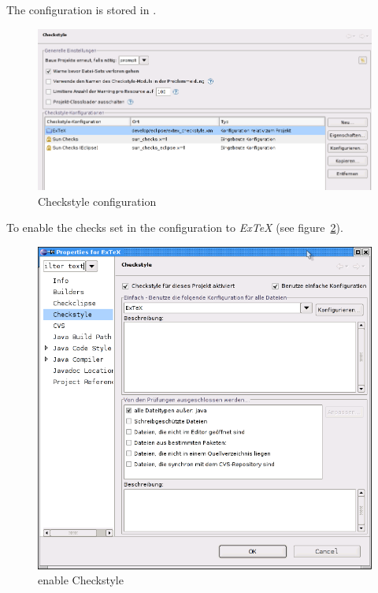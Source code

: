 The configuration is stored in .
\begin{figure}[htp]
  \centering  \includegraphics[scale=.5]{image/eclipse/checkstyle-config}
  \caption{Checkstyle configuration}\label{fig:eclipse-checkstyle-config}
\end{figure}

To enable the checks set in  the configuration to \emph{ExTeX} (see
figure~\ref{fig:eclipse-checkstyle-enable}).
\begin{figure}[htp]
  \centering  \includegraphics[scale=.5]{image/eclipse/checkstyle-enable}
  \caption{enable Checkstyle}\label{fig:eclipse-checkstyle-enable}
\end{figure}

